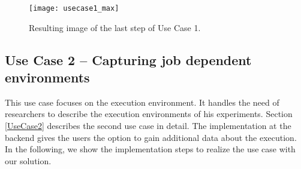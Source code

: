 \documentclass[draft,final]{vutinfth} %
\begin{document}
\begin{figure}[h]
	\centering
	\texttt{[image: usecase1\_max]}
	\caption{Resulting image of the last step of Use Case 1.}
	\label{fig:impl_usecase1_max} %
\end{figure}
	
\subsection{Use Case 2 – Capturing job dependent environments}\label{Implementation:Use Case2}
This use case focuses on the execution environment. It handles the need of researchers to describe the execution environments of his experiments. Section \ref{UseCase2} describes the second use case in detail. The implementation at the backend gives the users the option to gain additional data about the execution. In the following, we show the implementation steps to realize the use case with our solution. 
\end{document}
